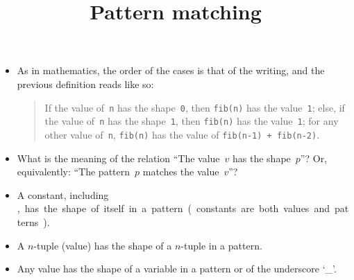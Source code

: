 \documentclass[wide]{slides}
\begin{document}
\begin{slide}
  \title{Pattern matching}

  \begin{itemize}

    \item As in mathematics, the order of the cases is that of the
      writing, and the previous definition reads like so:
      \begin{quote}
        If the value of~\texttt{n} has the shape~\texttt{0}, then
        \texttt{fib(n)} has the value~\texttt{1}; else, if the value
        of~\texttt{n} has the shape~\texttt{1}, then \texttt{fib(n)}
        has the value~\texttt{1}; for any other value of~\texttt{n},
        \texttt{fib(n)} has the value of \texttt{fib(n-1) + fib(n-2)}.
      \end{quote}

    \item What is the meaning of the relation ``The value~\(v\) has
      the shape~\(p\)''? Or, equivalently: ``The pattern~\(p\) matches
      the value~\(v\)''?

    \item A constant, including \unit, has the shape of itself in a
      pattern (constants are both values and patterns).

    \item A \(n\)-tuple (value) has the shape of a \(n\)-tuple in a
      pattern.

    \item Any value has the shape of a variable in a pattern or of the
      underscore `{\Large \_}'.

  \end{itemize}

\end{slide}
\end{document}
